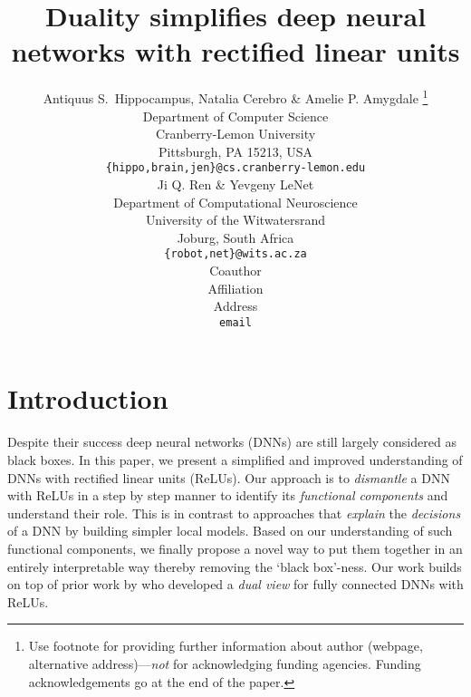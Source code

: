 \documentclass{article} %
\title{Duality simplifies deep neural networks with rectified linear units}
\author{Antiquus S.~Hippocampus, Natalia Cerebro \& Amelie P. Amygdale \thanks{ Use footnote for providing further information
about author (webpage, alternative address)---\emph{not} for acknowledging
funding agencies.  Funding acknowledgements go at the end of the paper.} \\
Department of Computer Science\\
Cranberry-Lemon University\\
Pittsburgh, PA 15213, USA \\
\texttt{\{hippo,brain,jen\}@cs.cranberry-lemon.edu} \\
\And
Ji Q. Ren \& Yevgeny LeNet \\
Department of Computational Neuroscience \\
University of the Witwatersrand \\
Joburg, South Africa \\
\texttt{\{robot,net\}@wits.ac.za} \\
\AND
Coauthor \\
Affiliation \\
Address \\
\texttt{email}
}
\begin{document}
\maketitle





\section{Introduction}

Despite their success deep neural networks (DNNs) are still largely considered as black boxes. In this paper, we present a simplified and improved understanding of DNNs with rectified linear units (ReLUs). Our approach is to \emph{dismantle} a DNN with ReLUs in a step by step manner to identify its \emph{functional components} and understand their role. This is in contrast to approaches that \emph{explain} the \emph{decisions} of a DNN by building simpler local models. Based on our understanding of such functional components, we finally propose a novel way to put them together in an entirely interpretable way thereby removing the `black box'-ness. Our work builds on top of prior work by \cite{npk} who developed a \emph{dual view} for fully connected DNNs with ReLUs.
\end{document}
